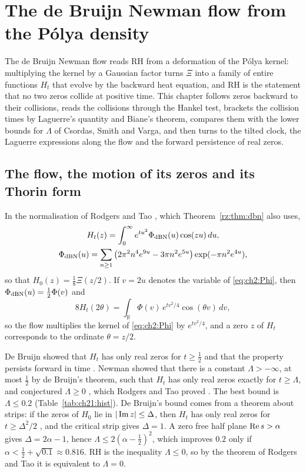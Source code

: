 \section{The de Bruijn Newman flow from the P\'olya density}\label{ch:dbn}

The de Bruijn Newman flow reads RH from a deformation of the P\'olya kernel: multiplying the kernel by a Gaussian factor turns $\Xi$ into a family of entire functions $H_t$ that evolve by the backward heat equation, and RH is the statement that no two zeros collide at positive time. This chapter follows zeros backward to their collisions, reads the collisions through the Hankel test, brackets the collision times by Laguerre's quantity and Biane's theorem, compares them with the lower bounds for $\Lambda$ of Csordas, Smith and Varga, and then turns to the tilted clock, the Laguerre expressions along the flow and the forward persistence of real zeros.

\subsection{The flow, the motion of its zeros and its Thorin form}\label{sec:ch21:flow}

In the normalisation of Rodgers and Tao \cite{RodgersTao}, which Theorem~\ref{rz:thm:dbn} also uses,
\begin{gather*}
H_t(z)=\int_0^\infty e^{tu^2}\Phi_{\rm dBN}(u)\cos(zu)\,du,\\
\Phi_{\rm dBN}(u)=\sum_{n\ge1}\big(2\pi^2n^4e^{9u}-3\pi n^2e^{5u}\big)\exp(-\pi n^2e^{4u}),
\end{gather*}
so that $H_0(z)=\frac18\Xi(z/2)$. If $v=2u$ denotes the variable of \eqref{eq:ch2:Phi}, then $\Phi_{\rm dBN}(u)=\frac12\Phi(v)$ and
\[
8H_t(2\theta)=\int_{\mathbb R}\Phi(v)\,e^{tv^2/4}\cos(\theta v)\,dv,
\]
so the flow multiplies the kernel of \eqref{eq:ch2:Phi} by $e^{tv^2/4}$, and a zero $z$ of $H_t$ corresponds to the ordinate $\theta=z/2$.

De Bruijn showed that $H_t$ has only real zeros for $t\ge\frac12$ and that the property persists forward in time \cite{deBruijn}. Newman showed that there is a constant $\Lambda>-\infty$, at most $\frac12$ by de Bruijn's theorem, such that $H_t$ has only real zeros exactly for $t\ge\Lambda$, and conjectured $\Lambda\ge0$ \cite{Newman1976}, which Rodgers and Tao proved \cite{RodgersTao}. The best bound is $\Lambda\le0.2$ \cite{PT21} (Table~\ref{tab:ch21:hist}). De Bruijn's bound comes from a theorem about strips: if the zeros of $H_0$ lie in $|\operatorname{Im} z|\le\Delta$, then $H_t$ has only real zeros for $t\ge\Delta^2/2$ \cite[Theorem 13]{deBruijn}, and the critical strip gives $\Delta=1$. A zero free half plane $\operatorname{Re} s>\alpha$ gives $\Delta=2\alpha-1$, hence $\Lambda\le2(\alpha-\frac12)^2$, which improves $0.2$ only if $\alpha<\frac12+\sqrt{0.1}\approx0.816$. RH is the inequality $\Lambda\le0$, so by the theorem of Rodgers and Tao it is equivalent to $\Lambda=0$.

